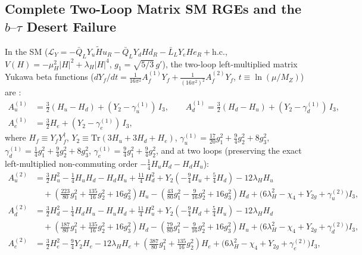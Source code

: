 \documentclass[11pt,a4paper]{article}
\begin{document}
\subsection{Complete Two-Loop Matrix SM RGEs and the \texorpdfstring{$b\text{--}\tau$}{b-tau} Desert Failure}
\label{subsec:desert-nogo}

In the SM ($\mathcal{L}_Y = -\bar{Q}_L Y_u \tilde{H} u_R - \bar{Q}_L Y_d H d_R - \bar{L}_L Y_e H e_R + \mathrm{h.c.}$, $V(H) = -\mu_H^2 |H|^2 + \lambda_H |H|^4$, $g_1 = \sqrt{5/3}\,g'$), the two-loop left-multiplied matrix Yukawa beta functions ($dY_f/dt = \frac{1}{16\pi^2} A_f^{(1)} Y_f + \frac{1}{(16\pi^2)^2} A_f^{(2)} Y_f$, $t \equiv \ln(\mu/M_Z)$) are \cite{MachacekVaughn1984,LuoXiao2003,Buttazzo2013}:
\begin{align}
A_u^{(1)} &= \frac{3}{2}(H_u - H_d) + (Y_2 - \gamma_u^{(1)})\,I_3, \qquad
A_d^{(1)} = \frac{3}{2}(H_d - H_u) + (Y_2 - \gamma_d^{(1)})\,I_3, \nonumber\\
A_e^{(1)} &= \frac{3}{2} H_e + (Y_2 - \gamma_e^{(1)})\,I_3, \label{eq:beta1-sm}
\end{align}
where $H_f \equiv Y_f Y_f^\dagger$, $Y_2 \equiv \mathrm{Tr}(3H_u + 3H_d + H_e)$, $\gamma_u^{(1)} = \frac{17}{20}g_1^2 + \frac{9}{4}g_2^2 + 8g_3^2$, $\gamma_d^{(1)} = \frac{1}{4}g_1^2 + \frac{9}{4}g_2^2 + 8g_3^2$, $\gamma_e^{(1)} = \frac{9}{4}g_1^2 + \frac{9}{4}g_2^2$, and at two loops (preserving the exact left-multiplied non-commuting order $-\frac{1}{4}H_u H_d - H_d H_u$):
\begin{align}
A_u^{(2)} &= \frac{3}{2}H_u^2 - \frac{1}{4}H_u H_d - H_d H_u + \frac{11}{4}H_d^2 + Y_2\left(-\frac{9}{4}H_u + \frac{5}{4}H_d\right) - 12\lambda_H H_u \nonumber\\
&\quad + \left(\frac{223}{80}g_1^2 + \frac{135}{16}g_2^2 + 16g_3^2\right)H_u - \left(\frac{43}{80}g_1^2 - \frac{9}{16}g_2^2 + 16g_3^2\right)H_d + \big(6\lambda_H^2 - \chi_4 + Y_{2g} + \gamma_u^{(2)}\big)I_3, \label{eq:beta2-u}\\
A_d^{(2)} &= \frac{3}{2}H_d^2 - \frac{1}{4}H_d H_u - H_u H_d + \frac{11}{4}H_u^2 + Y_2\left(-\frac{9}{4}H_d + \frac{5}{4}H_u\right) - 12\lambda_H H_d \nonumber\\
&\quad + \left(\frac{187}{80}g_1^2 + \frac{135}{16}g_2^2 + 16g_3^2\right)H_d - \left(\frac{79}{80}g_1^2 - \frac{9}{16}g_2^2 + 16g_3^2\right)H_u + \big(6\lambda_H^2 - \chi_4 + Y_{2g} + \gamma_d^{(2)}\big)I_3, \label{eq:beta2-d}\\
A_e^{(2)} &= \frac{3}{2}H_e^2 - \frac{9}{4}Y_2 H_e - 12\lambda_H H_e + \left(\frac{387}{80}g_1^2 + \frac{135}{16}g_2^2\right)H_e + \big(6\lambda_H^2 - \chi_4 + Y_{2g} + \gamma_e^{(2)}\big)I_3, \label{eq:beta2-e}
\end{align}
\end{document}
